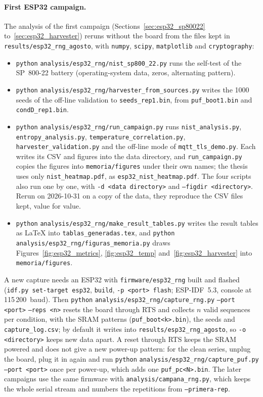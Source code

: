 \paragraph{First ESP32 campaign.} The analysis of the first campaign
(Sections~\ref{sec:esp32_sp80022} to~\ref{sec:esp32_harvester}) reruns
without the board from the files kept in
\nolinkurl{results/esp32_rng_agosto}, with \texttt{numpy}, \texttt{scipy},
\texttt{matplotlib} and \texttt{cryptography}:
\begin{itemize}
\item \texttt{python} \nolinkurl{analysis/esp32_rng/nist_sp800_22.py} runs
  the self-test of the SP~800-22 battery (operating-system data, zeros,
  alternating pattern).
\item \texttt{python} \nolinkurl{analysis/esp32_rng/harvester_from_sources.py}
  writes the 1000 seeds of the off-line validation to
  \texttt{seeds\_rep1.bin}, from \texttt{puf\_boot1.bin} and
  \texttt{condD\_rep1.bin}.
\item \texttt{python} \nolinkurl{analysis/esp32_rng/run_campaign.py} runs
  \texttt{nist\_analysis.py}, \texttt{entropy\_analysis.py},
  \texttt{temperature\_correlation.py}, \texttt{harvester\_validation.py}
  and the off-line mode of \texttt{mqtt\_tls\_demo.py}. Each writes its CSV
  and figures into the data directory, and \texttt{run\_campaign.py} copies
  the figures into \nolinkurl{memoria/figures} under their own names; the
  thesis uses only \texttt{nist\_heatmap.pdf}, as
  \texttt{esp32\_nist\_heatmap.pdf}. The four scripts also run one by one,
  with \texttt{-d <data directory>} and \texttt{--figdir <directory>}.
  Rerun on 2026-10-31 on a copy of the data, they reproduce the CSV files
  kept, value for value.
\item \texttt{python} \nolinkurl{analysis/esp32_rng/make_result_tables.py}
  writes the result tables as \LaTeX{} into \texttt{tablas\_generadas.tex},
  and \texttt{python} \nolinkurl{analysis/esp32_rng/figuras_memoria.py}
  draws Figures~\ref{fig:esp32_metrics}, \ref{fig:esp32_temp}
  and~\ref{fig:esp32_harvester} into \nolinkurl{memoria/figures}.
\end{itemize}
A new capture needs an ESP32 with \nolinkurl{firmware/esp32_rng} built and
flashed (\texttt{idf.py set-target esp32}, \texttt{build},
\texttt{-p <port> flash}; ESP-IDF~5.3, console at 115\,200~baud). Then
\texttt{python} \nolinkurl{analysis/esp32_rng/capture_rng.py}
\texttt{--port <port>} \texttt{--reps <n>} resets the board through RTS
and collects $n$ valid sequences per condition, with the SRAM patterns
(\texttt{puf\_boot<k>.bin}), the seeds and \texttt{capture\_log.csv}; by
default it writes into \nolinkurl{results/esp32_rng_agosto}, so
\texttt{-o <directory>} keeps new data apart. A reset through RTS keeps
the SRAM powered and does not give a new power-up pattern: for the clean
series, unplug the board, plug it in again and run
\texttt{python} \nolinkurl{analysis/esp32_rng/capture_puf.py}
\texttt{--port <port>} once per power-up, which adds one
\texttt{puf\_pc<N>.bin}. The later campaigns use the same firmware with
\nolinkurl{analysis/campana_rng.py}, which keeps the whole serial stream
and numbers the repetitions from \texttt{--primera-rep}.
